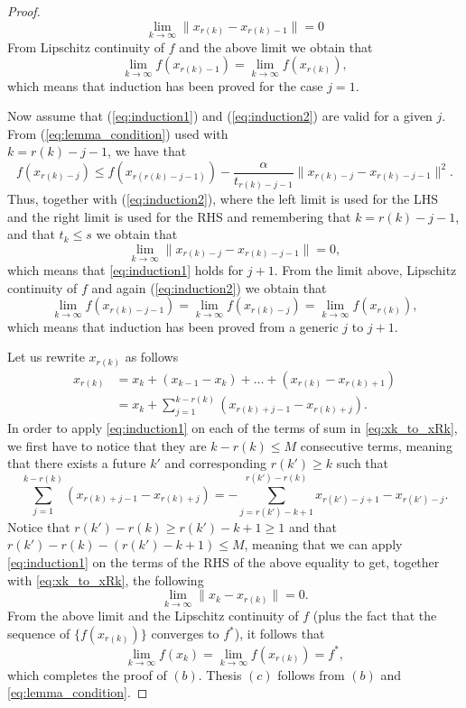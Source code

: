 \documentclass[10pt,a4paper]{article}
\begin{document}
\begin{proof}
	$$ \displaystyle \lim_{k \to \infty} \| x_{r(k)} -x_{r(k)-1}\| = 0$$
	From Lipschitz continuity of $f$ and the above limit we obtain that
	\begin{equation*}
		\displaystyle \lim_{k\to\infty} f(x_{r(k) -1}) = \displaystyle \lim_{k\to\infty} f(x_{r(k) }),
	\end{equation*}
	which means that induction has been proved for the case $j=1$.
	\par Now assume that (\ref{eq:induction1}) and (\ref{eq:induction2}) are valid for a given $j$. From (\ref{eq:lemma_condition}) used with\\ $k = r(k) -j -1$, we have that
	$$ f(x_{r(k) -j}) \leq f(x_{r(r(k)-j -1)}) - \frac{\alpha}{t_{r(k)-j-1}}\| x_{r(k)-j} - x_{r(k)-j-1}\|^2.$$
	Thus, together with (\ref{eq:induction2}), where the left limit is used for the LHS and the right limit is used for the RHS and remembering that $k=  r(k) -j -1$, and that $t_k\leq s$ we obtain that
	$$ \displaystyle \lim_{k \to \infty} \| x_{r(k)-j} - x_{r(k)-j-1} \| = 0,$$
	which means that \eqref{eq:induction1} holds for $j+1$.	From the limit above, Lipschitz continuity of $f$ and again (\ref{eq:induction2}) we obtain that
	\begin{equation*}
		\displaystyle \lim_{k\to\infty} f(x_{r(k)-j-1}) =\displaystyle \lim_{k\to\infty} f(x_{r(k)-j})  = \displaystyle \lim_{k\to\infty} f(x_{r(k)}), 
	\end{equation*}
	which means that induction has been proved from a generic $j$ to $j+1$.
	\par Let us rewrite $x_{r(k)}$ as follows 
	\begin{equation} \label{eq:xk_to_xRk}
		\begin{split}
			x_{r(k)} &= x_k + (x_{k-1} - x_k) + \dots +(x_{r(k)} - x_{r(k)+1})\\
			&= x_k + \sum_{j=1}^{k-r(k)} \left (x_{r(k) +j-1} - x_{r(k)+j} \right ).
		\end{split}
	\end{equation}
	In order to apply \eqref{eq:induction1} on each of the terms of sum in \eqref{eq:xk_to_xRk}, we first have to notice that they are $k-r(k)  \leq M$ consecutive terms, meaning that there exists a future $k'$ and corresponding $r(k')\geq k$ such that
	$$\sum_{j=1}^{k-r(k)} \left (x_{r(k) +j-1} - x_{r(k)+j} \right ) = - \sum_{j=r(k')-k+1}^{r(k')-r(k)} x_{r(k') -j+1} - x_{r(k')-j}.$$
    Notice that $r(k')-r(k)\geq r(k')-k+1 \geq 1$ and that $r(k')-r(k) - (r(k')-k+1)\leq M$, meaning that we can apply \eqref{eq:induction1} on the terms of the RHS of the above equality to get, together with \eqref{eq:xk_to_xRk}, the following
	\begin{equation*}
		\displaystyle \lim_{k\to \infty} \| x_k - x_{r(k)}\| = 0.
	\end{equation*}
	From the above limit and the Lipschitz continuity of $f$ (plus the fact that the sequence of $\{f(x_{r(k)})\}$ converges to $f^*$), it follows that
	$$ \displaystyle\lim_{k\to \infty} f(x_k) = \displaystyle\lim_{k\to \infty}  f(x_{r(k)})= f^*,$$
	which completes the proof of $(b)$. Thesis $(c)$ follows from $(b)$ and \eqref{eq:lemma_condition}. 
\end{proof}
\end{document}
